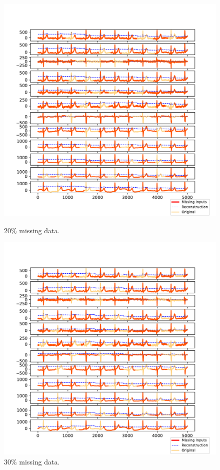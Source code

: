 \documentclass{mldsmsc}
\begin{document}
\begin{figure}[H]
\centering
\begin{minipage}{0.4\linewidth}
    \centering
    \includegraphics[width=\linewidth]{images/missing/mlesmf_output_20_3.pdf}
    \caption{$20\%$ missing data.}
\end{minipage}%
\hspace{0.05\linewidth}
\begin{minipage}{0.4\linewidth}
    \centering
    \includegraphics[width=\linewidth]{images/missing/mlesmf_output_30_3.pdf}
    \caption{$30\%$ missing data.}
\end{minipage}


\end{figure}
\end{document}
